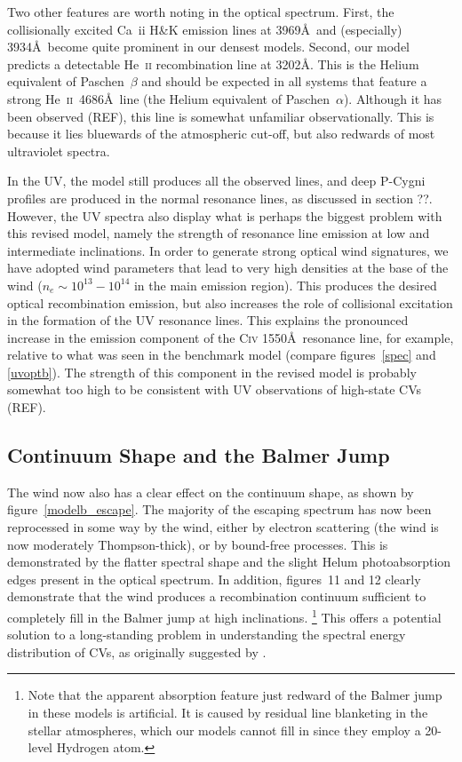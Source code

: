 \documentclass[preprint, a4paper, 11pt]{aastex}
\begin{document}
Two other features are worth noting in the optical
spectrum. First, the collisionally excited Ca~{\sc ii} H\&K 
emission lines at 3969\AA\ and (especially) 3934\AA\ 
become quite prominent in our densest models. Second, our model predicts a detectable
He~\textsc{ii} recombination line at 3202\AA. This is the Helium
equivalent of Paschen~$\beta$ and should be expected in all systems that
feature a strong He~\textsc{ii}~4686\AA\ line (the Helium
equivalent of Paschen~$\alpha$). Although it has been observed (REF),
this line is somewhat unfamiliar observationally. 
This is because it lies bluewards of the atmospheric cut-off, but
also redwards of most ultraviolet spectra. 

In the UV, the model still produces all the observed lines, 
and deep P-Cygni profiles are produced in the normal resonance lines,
as discussed in section ??. However, the UV spectra also
display what is perhaps the biggest problem with this revised model,
namely the strength of resonance line emission 
at low and intermediate inclinations.
In order to generate strong optical wind signatures, we have adopted wind
parameters that lead to very high densities at the base of the wind
($n_e\sim10^{13}-10^{14}$ in the main emission region). This produces
the desired optical recombination emission, but also increases the
role of collisional excitation in the formation of the UV resonance
lines. This explains the pronounced increase in the emission component 
of the C\textsc{iv} 1550\AA\ resonance line, for example, relative to
what was seen in the benchmark model (compare figures~\ref{spec} and
\ref{uvoptb}). The strength of this component in the revised model 
is probably somewhat too high to be consistent with UV observations 
of high-state CVs (REF).

\subsection{Continuum Shape and the Balmer Jump}

The wind now also has a clear effect on the continuum shape,
as shown by figure~\ref{modelb_escape}. The majority of the
escaping spectrum has now been reprocessed in some way by the wind,
either by electron scattering (the wind is now moderately Thompson-thick),
or by bound-free processes. This is demonstrated by the flatter spectral shape
and the slight Helum photoabsorption edges present in the optical spectrum.
In addition, figures~11 and 12 clearly demonstrate that the wind produces
a recombination continuum sufficient to completely fill in the Balmer jump
at high inclinations. \footnote{Note that the apparent absorption feature 
just redward of the Balmer jump in these models is artificial. It is
caused by residual line blanketing in the stellar atmospheres, which
our models cannot fill in since they employ a 20-level Hydrogen atom.}
This offers a potential solution to a long-standing problem in
understanding the spectral energy distribution of CVs, as
originally suggested by \cite{KLWB98}. 
\end{document}
